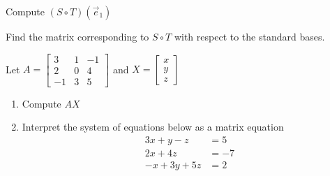 \begin{applicationActivities}{1}{22}
\begin{activity}{0}
  Compute $(S \circ T)(\vec{e}_1)$
\end{activity}

\begin{activity}{0}
  Find the matrix corresponding to $S \circ T$ with respect to the standard bases.
\end{activity}

\begin{activity}{0}
Let $A=\begin{bmatrix} 3 & 1 & -1 \\ 2 & 0 & 4 \\ -1 & 3 & 5 \end{bmatrix}$ and $X=\begin{bmatrix} x \\ y \\ z \end{bmatrix}$
\begin{enumerate}
\item Compute $AX$
\item Interpret the system of equations below as a matrix equation
\begin{align*}
3x+y-z &= 5 \\ 2x+4z &= -7 \\ -x+3y+5z &=2
\end{align*}
\end{enumerate}
\end{activity}

\end{applicationActivities}
